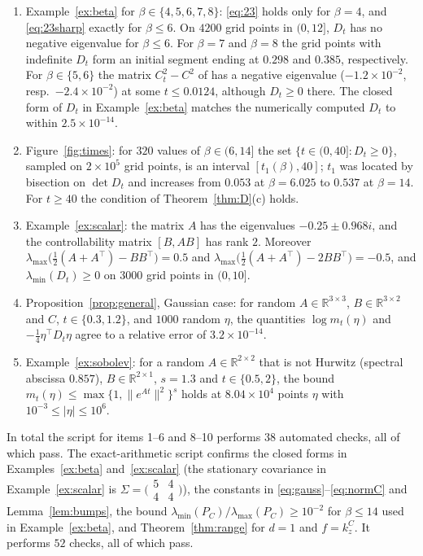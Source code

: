 \documentclass[11pt]{amsart}
\numberwithin{equation}{section}
\theoremstyle{definition}
\theoremstyle{remark}
\newcommand{\R}{\mathbb{R}}
\newcommand{\tp}{\top}
\begin{document}
\begin{enumerate}
$\beta=5$, $t=0.4$, $x=(0.3,-0.2)^\tp$ and $z=(0.5,0.4)^\tp$, using $2\times10^6$ exact Gaussian samples of $Z_t$:
$0.436373\pm2.2\times10^{-4}$ (one standard error) against the closed form $0.436051$, a deviation of $1.45$ standard
errors.
\item Example~\ref{ex:beta} for $\beta\in\{4,5,6,7,8\}$: \eqref{eq:23} holds only for $\beta=4$, and
\eqref{eq:23sharp} exactly for $\beta\le6$. On $4200$ grid points in $(0,12]$, $D_t$ has no negative eigenvalue for
$\beta\le6$. For $\beta=7$ and $\beta=8$ the grid points with indefinite $D_t$ form an initial segment ending at $0.298$
and $0.385$, respectively. For $\beta\in\{5,6\}$ the matrix $C_t^2-C^2$ of \cite{PSWPN} has a negative eigenvalue
($-1.2\times10^{-2}$, resp.\ $-2.4\times10^{-2}$) at some $t\le0.0124$, although $D_t\ge0$ there. The closed form of $D_t$
in Example~\ref{ex:beta} matches the numerically computed $D_t$ to within $2.5\times10^{-14}$.
\item Figure~\ref{fig:times}: for $320$ values of $\beta\in(6,14]$ the set $\{t\in(0,40]:D_t\ge0\}$, sampled on
$2\times10^5$ grid points, is an interval $[t_1(\beta),40]$; $t_1$ was located by bisection on $\det D_t$ and increases
from $0.053$ at $\beta=6.025$ to $0.537$ at $\beta=14$. For $t\ge40$ the condition of Theorem~\ref{thm:D}(c) holds.
\item Example~\ref{ex:scalar}: the matrix $A$ has the eigenvalues $-0.25\pm0.968i$, and the controllability matrix
$[B,AB]$ has rank $2$. Moreover $\lambda_{\max}\bigl(\frac12(A+A^\tp)-BB^\tp\bigr)=0.5$ and
$\lambda_{\max}\bigl(\frac12(A+A^\tp)-2BB^\tp\bigr)=-0.5$, and $\lambda_{\min}(D_t)\ge0$ on $3000$ grid points
in $(0,10]$.
\item Proposition~\ref{prop:general}, Gaussian case: for random $A\in\R^{3\times3}$, $B\in\R^{3\times2}$ and $C$,
$t\in\{0.3,1.2\}$, and $1000$ random $\eta$, the quantities $\log m_t(\eta)$ and $-\frac14\eta^\tp D_t\eta$ agree to a
relative error of $3.2\times10^{-14}$.
\item Example~\ref{ex:sobolev}: for a random $A\in\R^{2\times2}$ that is not Hurwitz (spectral abscissa $0.857$),
$B\in\R^{2\times1}$, $s=1.3$ and $t\in\{0.5,2\}$, the bound $m_t(\eta)\le\max\{1,\|e^{At}\|^2\}^s$ holds at
$8.04\times10^4$ points $\eta$ with $10^{-3}\le|\eta|\le10^{6}$.
\end{enumerate}
In total the script for items 1--6 and 8--10 performs $38$ automated checks, all of which pass. The exact-arithmetic
script confirms the closed forms in Examples~\ref{ex:beta} and~\ref{ex:scalar} (the stationary covariance in
Example~\ref{ex:scalar} is $\Sigma=\bigl(\begin{smallmatrix}5&4\\4&4\end{smallmatrix}\bigr)$), the constants in
\eqref{eq:gauss}--\eqref{eq:normC} and Lemma~\ref{lem:bumps}, the bound $\lambda_{\min}(P_C)/\lambda_{\max}(P_C)\ge10^{-2}$
for $\beta\le14$ used in Example~\ref{ex:beta}, and Theorem~\ref{thm:range} for $d=1$ and $f=k^C_z$. It performs $52$
checks, all of which pass.
\end{document}
